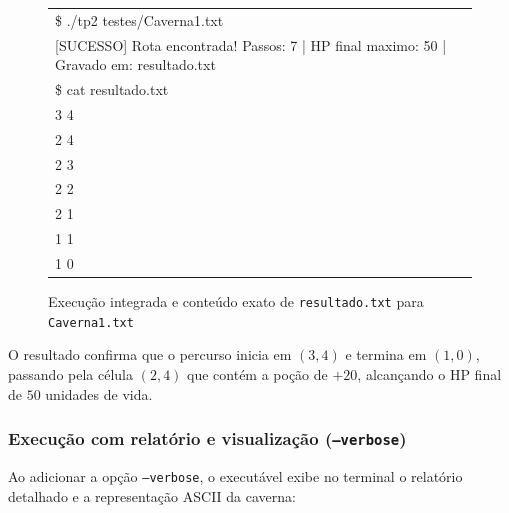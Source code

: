 \documentclass[12pt,a4paper]{article}
\makeatletter
\DeclareRobustCommand{\_}{%
  \ifmmode
    \nfss@text{\textunderscore}%
  \else
    \textunderscore\allowbreak
  \fi
}
\makeatother
\begin{document}
\begin{figure}[htbp]
    \centering
    \begin{minipage}{0.85\textwidth}
        \ttfamily\small
        \begin{tabular}{|l|}
        \hline
        \$ ./tp2 testes/Caverna1.txt \\
        {[SUCESSO]} Rota encontrada! Passos: 7 | HP final maximo: 50 | Gravado em: resultado.txt \\[0.15cm]
        \$ cat resultado.txt \\
        3 4 \\
        2 4 \\
        2 3 \\
        2 2 \\
        2 1 \\
        1 1 \\
        1 0 \\
        \hline
        \end{tabular}
    \end{minipage}
    \vspace{0.2cm}
    \caption{Execução integrada e conteúdo exato de \texttt{resultado.txt} para \texttt{Caverna1.txt}}
    \label{fig:exec_caverna1}
\end{figure}

O resultado confirma que o percurso inicia em $(3,4)$ e termina em $(1,0)$, passando pela célula $(2,4)$ que contém a poção de $+20$, alcançando o HP final de $50$ unidades de vida.

\subsubsection*{Execução com relatório e visualização (\texttt{--verbose})}

Ao adicionar a opção \texttt{--verbose}, o executável exibe no terminal o relatório detalhado e a representação ASCII da caverna:
\end{document}
